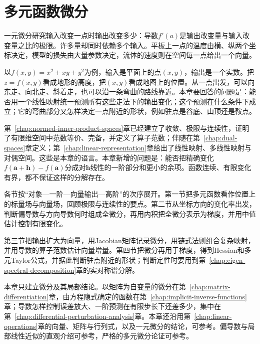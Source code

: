 \chapter{多元函数微分}
\label{chap:multivariate-differentiation}
\label{chap:multivariate-calculus}
\label{chap:multivariable-functions}

一元微分研究输入改变一点时输出改变多少：导数$f'(a)$是输出改变量与输入改变量之比的极限。许多量却同时依赖多个输入。平板上一点的温度由横、纵两个坐标决定，模型的损失由大量参数决定，流体的速度则在空间每一点给出一个向量。

以$f(x,y)=x^2+xy+y^2$为例，输入是平面上的点$(x,y)$，输出是一个实数。把$z=f(x,y)$看成地形的高度，把$(x,y)$看成地图上的位置。从一点出发，可以向东走、向北走、斜着走，也可以沿一条弯曲的路线靠近。本章要回答的问题是：能否用一个线性映射统一预测所有这些走法下的输出变化；这个预测在什么条件下成立；它的弯曲部分又怎样决定一点附近的形状，例如驻点是谷底、山顶还是鞍点。

第~\ref{chap:normed-inner-product-spaces}章已经建立了收敛、极限与连续性，证明了有限维空间中范数等价、完备，并定义了算子范数；伴随在第~\ref{chap:dual-spaces}章定义；第~\ref{chap:linear-representation}章给出了线性映射、多线性映射与对偶空间。这些是本章的语言。本章新增的问题是：能否把精确变化$f(\bm a+\bm h)-f(\bm a)$分成对$\bm h$线性的一阶部分和更小的余项。函数连续、有限变化有界，都不保证这样的分解存在。

各节按“对象—一阶—向量输出—高阶”的次序展开。第一节把多元函数看作位置上的标量场与向量场，回顾极限与连续性的要点。第二节从坐标方向的变化率出发，判断偏导数与方向导数何时组成全微分，再用内积把全微分表示为梯度，并用中值估计控制有限变化。

第三节把输出扩大为向量，用Jacobian矩阵记录微分，用链式法则组合复杂映射，并用导数的算子范数估计向量增量。第四节把微分再用于梯度，得到Hessian和多元Taylor公式，并据此判断驻点附近的形状；判断定性时要用到第~\ref{chap:eigen-spectral-decomposition}章的实对称谱分解。

本章只建立微分及其局部结论。以矩阵为自变量的微分在第~\ref{chap:matrix-differentiation}章，由方程隐式确定的函数在第~\ref{chap:implicit-inverse-functions}章；导数怎样控制误差放大、一阶预测在有限步长下还差多少，集中在第~\ref{chap:differential-perturbation-analysis}章。本章还沿用第~\ref{chap:linear-operations}章的向量、矩阵与行列式，以及一元微分的结论，可参考。偏导数与局部线性近似的直观介绍可参考，严格的多元微分论证可参考。






